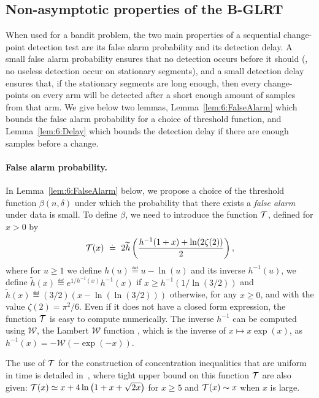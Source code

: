 \subsection{Non-asymptotic properties of the B-GLRT}\label{subsec:6:PropGLR}

When used for a bandit problem, the two main properties of a sequential change-point detection test are its false alarm probability and its detection delay.
%
A small false alarm probability ensures that no detection occurs before it should (\ie, no useless detection occur on stationary segments), and a small detection delay ensures that, if the stationary segments are long enough, then every change-points on every arm will be detected after a short enough amount of samples from that arm.
%
We give below two lemmas, Lemma~\ref{lem:6:FalseAlarm} which bounds the false alarm probability for a choice of threshold function, and Lemma~\ref{lem:6:Delay} which bounds the detection delay if there are enough samples before a change.


\paragraph{False alarm probability.}\label{par:6:falseAlarm}
%
In Lemma~\ref{lem:6:FalseAlarm} below, we propose a choice of the threshold function $\beta(n,\delta)$ under which the probability that there exists a \emph{false alarm} under \iid{} data is small. To define $\beta$, we need to introduce the function $\mathcal{T}$, defined for $x>0$ by
%
\begin{equation}\label{def:6:function_T}
    \mathcal{T}(x) ~ \overset{.}{=} ~ 2 \widetilde{h}\left(\frac{h^{-1}(1+x) + \ln(2\zeta(2))}{2}\right),
\end{equation}
where for $u \ge 1$ we define $h(u) \eqdef u - \ln(u)$ and its inverse $h^{-1}(u)$,
%
we define $\widetilde{h}(x) \eqdef e^{1/h^{-1}(x)} h^{-1}(x)$ if $x \ge h^{-1}(1/\ln (3/2))$ and $\widetilde{h}(x) \eqdef (3/2) (x-\ln(\ln (3/2)))$ otherwise, for any $x \ge 0$,
and with the value $\zeta(2) = \pi^2 / 6$.
%
Even if it does not have a closed form expression, the function $\mathcal{T}$ is easy to compute numerically.
%
The inverse $h^{-1}$ can be computed using $\mathcal{W}$, the Lambert $\mathcal{W}$ function \cite{Corless96}, which is the inverse of $x \mapsto x \exp(x)$, as $h^{-1}(x) = - \mathcal{W}(- \exp(-x))$.

The use of $\mathcal{T}$ for the construction of concentration inequalities that are uniform in time is detailed in~\cite{KK18Martingales}, where tight upper bound on this function $\mathcal{T}$ are also given:
$\mathcal{T} (x) \simeq x + 4 \ln\big(1 + x + \sqrt{2x}\big)$ for $x\geq 5$ and $\mathcal{T}(x) \sim x$ when $x$ is large.

